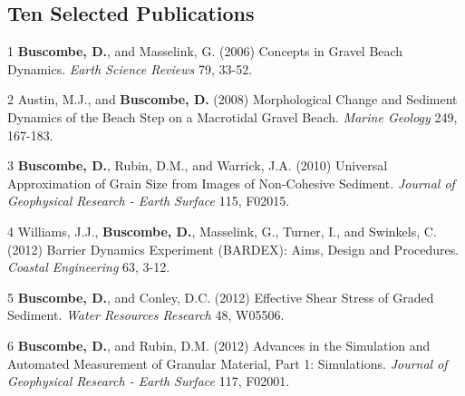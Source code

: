 \documentclass[margin,line]{resume}
\begin{document}
\begin{resume}
    \section{\mysidestyle Ten Selected Publications}

        \begin{footnotesize}
	\begin{list1}
	\item[1] {\bf Buscombe, D.}, and Masselink, G. (2006) Concepts in Gravel Beach Dynamics. {\sl Earth Science Reviews} 79, 33-52.\\
	
	
	\item[2] Austin, M.J., and {\bf Buscombe, D.} (2008) Morphological Change and Sediment Dynamics of the Beach Step on a Macrotidal Gravel Beach. {\sl Marine Geology} 249, 167-183. \\

	\item[3] {\bf Buscombe, D.}, Rubin, D.M., and Warrick, J.A. (2010) Universal Approximation of Grain Size from Images of Non-Cohesive Sediment. {\sl Journal of Geophysical Research - Earth Surface} 115, F02015.\\

	\item[4] Williams, J.J., {\bf Buscombe, D.}, Masselink, G., Turner, I., and Swinkels, C. (2012) Barrier Dynamics Experiment (BARDEX): Aims, Design and Procedures. {\sl Coastal Engineering} 63, 3-12.\\

	\item[5] {\bf Buscombe, D.}, and Conley, D.C. (2012) Effective Shear Stress of Graded Sediment. {\sl Water Resources Research} 48, W05506.\\

	\item[6] {\bf Buscombe, D.}, and Rubin, D.M. (2012) Advances in the Simulation and Automated Measurement of Granular Material, Part 1: Simulations. {\sl Journal of Geophysical Research - Earth Surface} 117, F02001.\\


\end{list1}
\end{footnotesize}
\end{resume}
\end{document}

